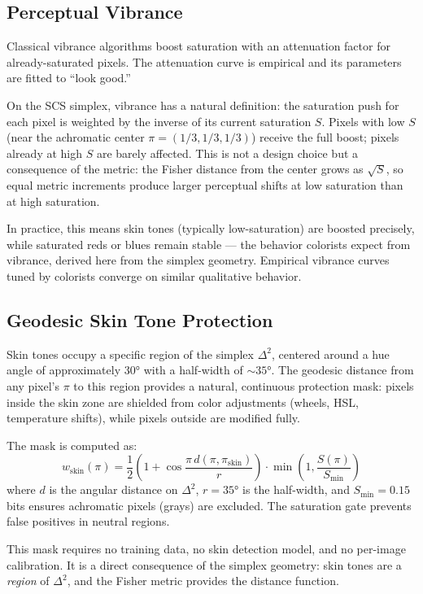 \documentclass[12pt,a4paper]{article}
\begin{document}
\subsection{Perceptual Vibrance}

Classical vibrance algorithms boost saturation with an attenuation
factor for already-saturated pixels. The attenuation curve is
empirical and its parameters are fitted to ``look good.''

On the SCS simplex, vibrance has a natural definition: the saturation
push for each pixel is weighted by the inverse of its current
saturation $S$. Pixels with low $S$ (near the achromatic center
$\pi = (1/3, 1/3, 1/3)$) receive the full boost; pixels already at
high $S$ are barely affected. This is not a design choice but a
consequence of the metric: the Fisher distance from the center grows
as $\sqrt{S}$, so equal metric increments produce larger perceptual
shifts at low saturation than at high saturation.

In practice, this means skin tones (typically low-saturation) are
boosted precisely, while saturated reds or blues remain stable ---
the behavior colorists expect from vibrance, derived here from the
simplex geometry. Empirical vibrance curves tuned by colorists
converge on similar qualitative behavior.

\subsection{Geodesic Skin Tone Protection}

Skin tones occupy a specific region of the simplex $\Delta^2$,
centered around a hue angle of approximately $30°$ with a half-width
of $\sim 35°$. The geodesic distance from any pixel's $\pi$ to this
region provides a natural, continuous protection mask: pixels inside
the skin zone are shielded from color adjustments (wheels, HSL,
temperature shifts), while pixels outside are modified fully.

The mask is computed as:
\[
  w_\mathrm{skin}(\pi) = \frac{1}{2}\left(1 + \cos\frac{\pi\, d(\pi, \pi_\mathrm{skin})}{r}\right) \cdot \min\!\left(1, \frac{S(\pi)}{S_\mathrm{min}}\right)
\]
where $d$ is the angular distance on $\Delta^2$, $r = 35°$ is the
half-width, and $S_\mathrm{min} = 0.15$ bits ensures achromatic
pixels (grays) are excluded. The saturation gate prevents false
positives in neutral regions.

This mask requires no training data, no skin detection model, and no
per-image calibration. It is a direct consequence of the simplex
geometry: skin tones are a \emph{region} of $\Delta^2$, and the
Fisher metric provides the distance function.
\end{document}
